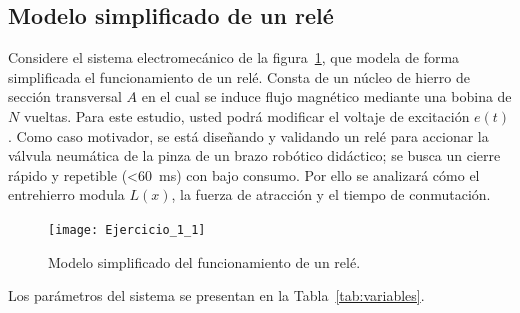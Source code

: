 \documentclass[
  11pt,
  letterpaper,
   addpoints,
   answers
  ]{exam}
\begin{document}
\begin{questions}
    \question \section*{Modelo simplificado de un relé}

Considere el sistema electromecánico de la figura~\ref{fig:relay}, que modela de forma simplificada el funcionamiento de un relé. Consta de un núcleo de hierro de sección transversal $A$ en el cual se induce flujo magnético mediante una bobina de $N$ vueltas. Para este estudio, usted podrá modificar el voltaje de excitación $e(t)$. Como caso motivador, se está diseñando y validando un relé para accionar la válvula neumática de la pinza de un brazo robótico didáctico; se busca un cierre rápido y repetible (\textless{}60~ms) con bajo consumo. Por ello se analizará cómo el entrehierro modula $L(x)$, la fuerza de atracción y el tiempo de conmutación.

\begin{figure}[h!]
  \centering
  \texttt{[image: Ejercicio\_1\_1]}
  \caption{Modelo simplificado del funcionamiento de un relé.}
  \label{fig:relay}
\end{figure}

Los parámetros del sistema se presentan en la Tabla~\ref{tab:variables}.


\end{questions}
\end{document}
